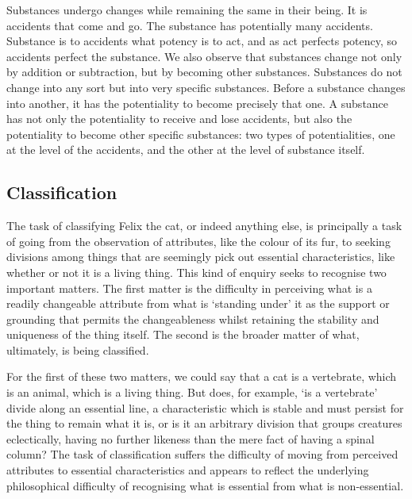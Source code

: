 \begin{quoting}
Substances undergo changes while remaining the same in their being. It is accidents that come and go. The substance has potentially many accidents. Substance is to accidents what potency is to act, and as act perfects potency, so accidents perfect the substance. We also observe that substances change not only by addition or subtraction, but by becoming other substances. Substances do not change into any sort but into very specific substances. Before a substance changes into another, it has the potentiality to become precisely that one. A substance has not only the potentiality to receive and lose accidents, but also the potentiality to become other specific substances: two types of potentialities, one at the level of the accidents, and the other at the level of substance itself.
\parencite[][49]{de1981christian}
\end{quoting}

\subsection{Classification}

The task of classifying Felix the cat, or indeed anything else, is principally a task of going from the observation of attributes, like the colour of its fur, to seeking divisions among things that are seemingly pick out essential characteristics, like whether or not it is a living thing. This kind of enquiry seeks to recognise two important matters. The first matter is the difficulty in perceiving what is a readily changeable attribute from what is `standing under' it as the support or grounding that permits the changeableness whilst retaining the stability and uniqueness of the thing itself. The second is the broader matter of what, ultimately, is being classified.

For the first of these two matters, we could say that a cat is a vertebrate, which is an animal, which is a living thing. But does, for example, `is a vertebrate' divide along an essential line, a characteristic which is stable and must persist for the thing to remain what it is, or is it an arbitrary division that groups creatures eclectically, having no further likeness than the mere fact of having a spinal column? The task of classification suffers the difficulty of moving from perceived attributes to essential characteristics and appears to reflect the underlying philosophical difficulty of recognising what is essential from what is non-essential.

